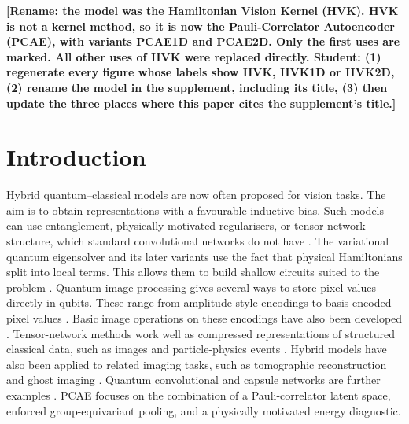 \documentclass[pdflatex,sn-basic]{sn-jnl}
\begin{document}
\maketitle

{\color{red}\textbf{[Rename: the model was the Hamiltonian Vision Kernel (HVK).
HVK is not a kernel method, so it is now the Pauli-Correlator Autoencoder
(PCAE), with variants PCAE1D and PCAE2D. Only the first uses are marked. All
other uses of HVK were replaced directly. Student: (1) regenerate every figure
whose labels show HVK, HVK1D or HVK2D, (2) rename the model in the supplement,
including its title, (3) then update the three places where this paper cites
the supplement's title.]}}

\tableofcontents
\section{Introduction}
\label{sec:intro}

Hybrid quantum--classical models are now often proposed for vision tasks. The
aim is to obtain representations with a favourable inductive bias. Such models
can use entanglement, physically motivated regularisers, or tensor-network
structure, which standard convolutional networks do not have \citep{Cerezo2021,
Tilly2022, Preskill2018}. The variational quantum eigensolver and its later
variants use the fact that physical Hamiltonians split into local terms. This
allows them to build shallow circuits suited to the problem \citep{Cerezo2021,
Tilly2022, Bauer2020}. Quantum image processing gives several ways to store
pixel values directly in qubits. These range from amplitude-style encodings
\citep{Le2011} to basis-encoded pixel values \citep{Zhang2013}. Basic image
operations on these encodings have also been developed \citep{Chakraborty2018,
Zhou2017, Yao2017}. Tensor-network methods work well as compressed
representations of structured classical data, such as images \citep{Cirac2021,
Latorre2005, Han2018, Stoudenmire2016, Ran2020TNCS, Guala2023} and
particle-physics events \citep{Araz2022}. Hybrid models have also been applied
to related imaging tasks, such as tomographic reconstruction \citep{Haga2024,
Nau2023} and ghost imaging \citep{Zhai2025}. Quantum convolutional and capsule
networks are further examples \citep{Slabbert2024, Cong2019, Hur2022, Liu2022}.
PCAE focuses on the combination of a Pauli-correlator latent space, enforced
group-equivariant pooling, and a physically motivated energy diagnostic.
\end{document}
